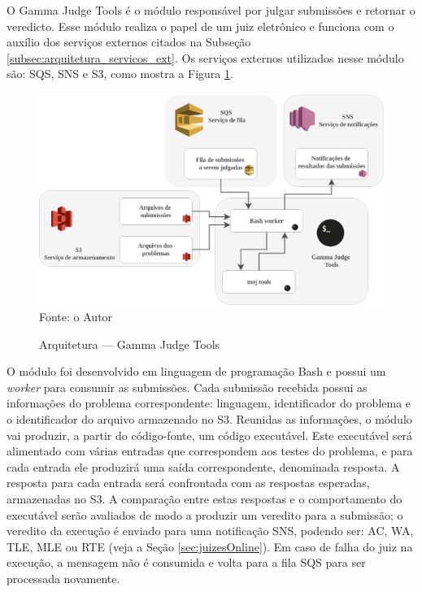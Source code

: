 O Gamma Judge Tools é o módulo responsável por julgar submissões e retornar o veredicto. Esse módulo realiza o papel de um juiz eletrônico e funciona com o auxílio dos serviços externos citados na Subseção \ref{subsec:arquitetura_servicos_ext}. Os serviços externos utilizados nesse módulo são: SQS, SNS e S3, como mostra a Figura \ref{fig:arquitetura_goj_tools}.

\begin{figure}
    \centering
    \caption{Arquitetura — Gamma Judge Tools}
    \includegraphics[keepaspectratio=true,scale=0.45]{figuras/arquitetura_goj_tools.eps}
    \label{fig:arquitetura_goj_tools}
    \medskip
    Fonte: o Autor
    \medskip
\end{figure}

O módulo foi desenvolvido em linguagem de programação Bash e possui um \textit{worker} para consumir as submissões. Cada submissão recebida possui as informações do problema correspondente: linguagem, identificador do problema e o identificador do arquivo armazenado no S3. Reunidas as informações, o módulo vai produzir, a partir do código-fonte, um código executável. Este executável será alimentado com várias entradas que correspondem aos testes do problema, e para cada entrada ele produzirá uma saída correspondente, denominada resposta. A resposta para cada entrada será confrontada com as respostas esperadas, armazenadas no S3. A comparação entre estas respostas e o comportamento do executável serão avaliados de modo a produzir um veredito para a submissão; o veredito da execução é enviado para uma notificação SNS, podendo ser: AC, WA, TLE, MLE ou RTE (veja a Seção \ref{sec:juizesOnline}). Em caso de falha do juiz na execução, a mensagem não é consumida e volta para a fila SQS para ser processada novamente.

